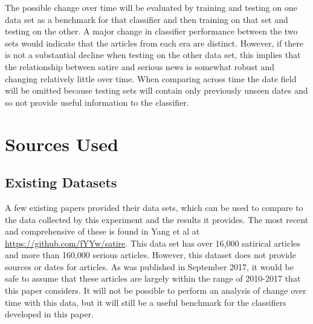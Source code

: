 \documentclass [12 pt] {report}
\begin{document}
The possible change over time will be evaluated by training and testing on one data set as a benchmark for that classifier and then training on that set and testing on the other. A major change in classifier performance between the two sets would indicate that the articles from each era are distinct. However, if there is not a substantial decline when testing on the other data set, this implies that the relationship between satire and serious news is somewhat robust and changing relatively little over time. When comparing across time the date field will be omitted because testing sets will contain only previously unseen dates and so not provide useful information to the classifier.

\section{Sources Used}

\subsection{Existing Datasets}
A few existing papers provided their data sets, which can be used to compare to the data collected by this experiment and the results it provides. The most recent and comprehensive of these is found in Yang et al \cite{Yang} at \url{https://github.com/fYYw/satire}. This data set has over 16,000 satirical articles and more than 160,000 serious articles. However, this dataset does not provide sources or dates for articles. As \cite{Yang} was published in September 2017, it would be safe to assume that these articles are largely within the range of 2010-2017 that this paper considers. It will not be possible to perform an analysis of change over time with this data, but it will still be a useful benchmark for the classifiers developed in this paper.
\end{document}
